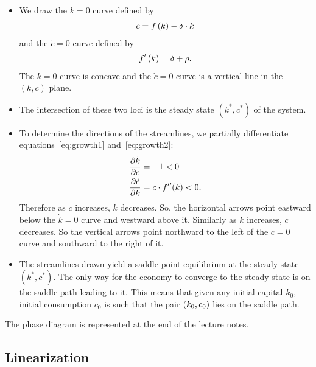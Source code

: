 \documentclass[letterpaper,12pt,leqno]{article}
\begin{document}
\begin{itemize}

\item We draw the $\dot{k}=0$ curve defined by
\begin{align*}
c=f\left( k \right) -\delta\cdot k
\end{align*}
and the $\dot{c}=0$ curve defined by
\begin{align*}
f^{\prime}\left( k \right) =\delta +\rho.
\end{align*}
The $\dot{k}=0$ curve is concave and the $\dot{c}=0$ curve is a vertical line in the $(k,c)$ plane.

\item The intersection of these two loci is the steady state $(k^{*},c^{*})$ of the system.

\item To determine the directions of the streamlines, we partially differentiate equations~\eqref{eq:growth1} and~\eqref{eq:growth2}: 
\begin{align*}
\frac{\partial \dot{k}}{\partial c} &=-1<0 \\
\frac{\partial \dot{c}}{\partial k} &=c\cdot f''(k)<0.
\end{align*}
Therefore as $c$ increases, $\dot{k}$ decreases. So, the horizontal arrows point eastward below the $\dot{k}=0$ curve and westward above it. Similarly as $k$ increases, $\dot{c}$ decreases. So the vertical arrows point northward to the left of the $\dot{c}=0$ curve and southward to the right of it.

\item The streamlines drawn yield a saddle-point equilibrium at the steady state $(k^{*},c^{*})$. The only way for the economy to converge to the steady state is on the saddle path leading to it. This means that given any initial capital $k_{0}$, initial consumption $c_{0}$ is such that the pair $\left( k_{0},c_{0} \right) $
lies on the saddle path.

\end{itemize}

The phase diagram is represented at the end of the lecture notes.

\subsection{Linearization}
\end{document}
